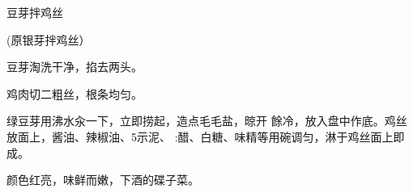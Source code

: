\begin{recipe}{豆芽拌鸡丝}

(原银芽拌鸡丝）

\ingredients



\cooking

\step 	豆芽淘洗干净，掐去两头。

\step 	鸡肉切二粗丝，根条均匀。

\step 	绿豆芽用沸水汆一下，立即捞起，造点毛毛盐，晾开 餘冷，放入盘中作底。鸡丝放面上，酱油、辣椒油、5示泥、 :醋、白糖、味精等用碗调匀，淋于鸡丝面上即成。

\notes

颜色红亮，味鲜而嫩，下酒的碟子菜。

\end{recipe}

